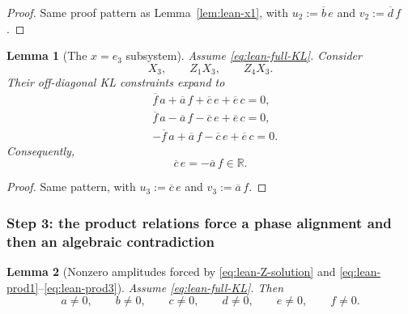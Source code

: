 \documentclass[11pt]{article}
\newtheorem{lemma}{Lemma}
\begin{document}
\begin{proof}
Same proof pattern as Lemma~\ref{lem:lean-x1}, with $u_2:=\overline b\,e$ and $v_2:=\overline d\,f$.
\end{proof}

\begin{lemma}[The $x=e_3$ subsystem]
\label{lem:lean-x3}
Assume \eqref{eq:lean-full-KL}. Consider
\[
X_3,\qquad Z_1X_3,\qquad Z_4X_3.
\]
Their off-diagonal KL constraints expand to
\begin{align}
&\overline f\,a+\overline a\,f+\overline c\,e+\overline e\,c=0,
\label{eq:lean-x3-0}\\
&\overline f\,a-\overline a\,f-\overline c\,e+\overline e\,c=0,
\label{eq:lean-x3-1}\\
&-\overline f\,a+\overline a\,f-\overline c\,e+\overline e\,c=0.
\label{eq:lean-x3-4}
\end{align}
Consequently,
\begin{equation}
\overline c\,e=-\overline a\,f\in\mathbb R.
\label{eq:lean-prod3}
\end{equation}
\end{lemma}

\begin{proof}
Same pattern, with $u_3:=\overline c\,e$ and $v_3:=\overline a\,f$.
\end{proof}

\subsubsection*{Step 3: the product relations force a phase alignment and then an algebraic contradiction}

\begin{lemma}[Nonzero amplitudes forced by \eqref{eq:lean-Z-solution} and \eqref{eq:lean-prod1}--\eqref{eq:lean-prod3}]
\label{lem:lean-nonzero}
Assume \eqref{eq:lean-full-KL}. Then
\[
a\neq 0,\qquad b\neq 0,\qquad c\neq 0,\qquad d\neq 0,\qquad e\neq 0,\qquad f\neq 0.
\]
\end{lemma}
\end{document}
